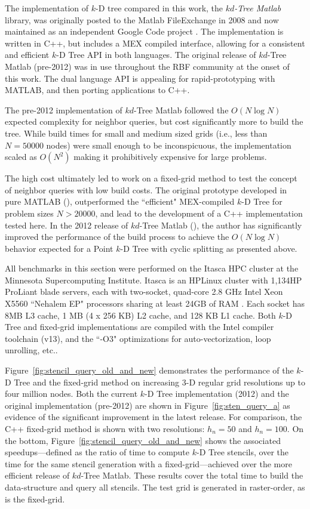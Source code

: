 \documentclass{report}
\begin{document}
The implementation of $k$-D tree compared in this work, the \emph{$kd$-Tree Matlab} library, was originally posted to the Matlab FileExchange in 2008 \cite{TagliasacchiMFE} and now maintained as an independent Google Code project \cite{TagliasacchiGC}. The implementation is written in C++, but includes a MEX compiled interface, allowing for a consistent and efficient $k$-D Tree API in both languages. 
The original release of $kd$-Tree Matlab (pre-2012) was in use throughout the RBF community at the onset of this work. The dual language API is appealing for rapid-prototyping with MATLAB, and then porting applications to C++. 

The pre-2012 implementation of $kd$-Tree Matlab followed the $O(N \log N)$ expected complexity for neighbor queries, but cost significantly more to build the tree. While build times for small and medium sized grids (i.e., less than $N=50000$ nodes) were small enough to be inconspicuous, the implementation scaled as $O(N^2)$ making it prohibitively expensive for large problems. 

The high cost ultimately led to work on a fixed-grid method to test the concept of neighbor queries with low build costs. The original prototype developed in pure MATLAB (\cite{BolligRBFFixedGrid}), outperformed the ``efficient" MEX-compiled $k$-D Tree for problem sizes $N > 20000$, and lead to the development of a C++ implementation tested here. In the 2012 release of $kd$-Tree Matlab (\cite{TagliasacchiGC}), the author has significantly improved the performance of the build process to achieve the $O(N \log N)$ behavior expected for a Point $k$-D Tree with cyclic splitting as presented above. 

All benchmarks in this section were performed on the Itasca HPC cluster at the Minnesota Supercomputing Institute. Itasca is an HPLinux cluster with 1,134HP ProLiant blade servers, each with two-socket, quad-core 2.8 GHz Intel Xeon X5560 ``Nehalem EP" processors sharing at least 24GB of RAM \cite{MSIItasca}. Each socket has 8MB L3 cache, 1 MB (4 x 256 KB) L2 cache, and 128 KB L1 cache. Both $k$-D Tree and fixed-grid implementations are compiled with the Intel compiler toolchain (v13), and the ``-O3" optimizations for auto-vectorization, loop unrolling, etc.. 

Figure~\ref{fig:stencil_query_old_and_new} demonstrates the performance of the $k$-D Tree and the fixed-grid method on increasing 3-D regular grid resolutions up to four million nodes. Both the current $k$-D Tree implementation (2012) and the original implementation (pre-2012) are shown in Figure~\ref{fig:sten_query_a} as evidence of the significant improvement in the latest release. For comparison, the C++ fixed-grid method is shown with two resolutions: $h_n = 50$ and $h_n=100$. On the bottom, Figure~\ref{fig:stencil_query_old_and_new} shows the associated speedups---defined as the ratio of time to compute $k$-D Tree stencils, over the time for the same stencil generation with a fixed-grid---achieved over the more efficient release of $kd$-Tree Matlab. These results cover the total time to build the data-structure and query all stencils. The test grid is generated in raster-order, as is the fixed-grid. 
\end{document}
